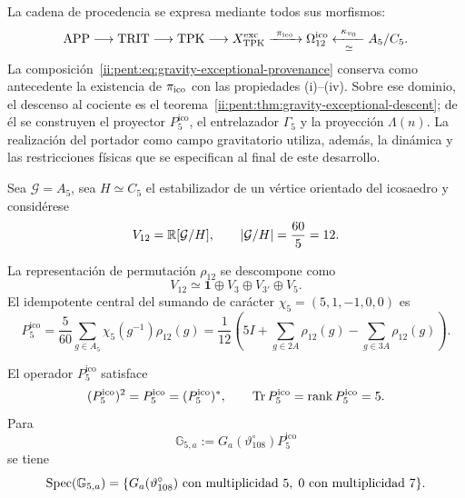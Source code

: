 La cadena de procedencia se expresa mediante todos sus morfismos:
\begin{equation}
\label{ii:pent:eq:gravity-exceptional-provenance}
\mathrm{APP}\longrightarrow\mathrm{TRIT}\longrightarrow\mathrm{TPK}
\longrightarrow X_{\rm TPK}^{\rm exc}
\xrightarrow{\ \pi_{\rm ico}\ }\Omega_{12}^{\rm ico}
\xleftarrow[\simeq]{\ \kappa_{v_0}\ }A_5/C_5.
\end{equation}
La composición~\eqref{ii:pent:eq:gravity-exceptional-provenance} conserva
como antecedente la existencia de \(\pi_{\rm ico}\) con las propiedades
(i)--(iv). Sobre ese dominio, el descenso al cociente es el
teorema~\ref{ii:pent:thm:gravity-exceptional-descent}; de él se construyen
el proyector \(P^{\mathrm{ico}}_5\), el entrelazador \(\Gamma_5\) y la
proyección \(\Lambda(n)\). La realización del portador como campo
gravitatorio utiliza, además, la dinámica y las restricciones físicas que
se especifican al final de este desarrollo.

Sea \(\mathcal G=A_5\), sea \(H\simeq C_5\) el estabilizador de un v\'ertice
orientado del icosaedro y consid\'erese
\begin{equation}
\label{ii:pent:eq:gravity-v12}
V_{12}=\mathbb R[\mathcal G/H],
\qquad |\mathcal G/H|=\frac{60}{5}=12.
\end{equation}


La representaci\'on de permutaci\'on \(\rho_{12}\) se descompone como
\begin{equation}
\label{ii:pent:eq:gravity-v12-decomposition}
V_{12}\simeq\mathbf1\oplus V_3\oplus V_{3'}\oplus V_5.
\end{equation}
El idempotente central del sumando de car\'acter
\(\chi_5=(5,1,-1,0,0)\) es
\begin{equation}
\label{ii:pent:eq:gravity-p5}
\boxed{
P^{\mathrm{ico}}_5=\frac5{60}\sum_{g\in A_5}\chi_5(g^{-1})\rho_{12}(g)
=\frac1{12}\left(
5I+\sum_{g\in2A}\rho_{12}(g)
-\sum_{g\in3A}\rho_{12}(g)
\right).}
\end{equation}

\begin{theorem}
\label{ii:pent:thm:gravity-p5-coupling}
El operador \(P^{\mathrm{ico}}_5\) satisface
\begin{equation}
\label{ii:pent:eq:gravity-p5-properties}
(P^{\mathrm{ico}}_5)^2=P^{\mathrm{ico}}_5=(P^{\mathrm{ico}}_5)^*,
\qquad \operatorname{Tr} P^{\mathrm{ico}}_5=\operatorname{rank} P^{\mathrm{ico}}_5=5.
\end{equation}
Para
\begin{equation}
\label{ii:pent:eq:gravity-G5}
\mathbb G_{5,a}:=G_a(\vartheta^\circ_{108})P^{\mathrm{ico}}_5
\end{equation}
se tiene
\begin{equation}
\label{ii:pent:eq:gravity-G5-spectrum}
\operatorname{Spec}(\mathbb G_{5,a})
=\{G_a(\vartheta^\circ_{108})\text{ con multiplicidad }5,
\;0\text{ con multiplicidad }7\}.
\end{equation}
\end{theorem}

